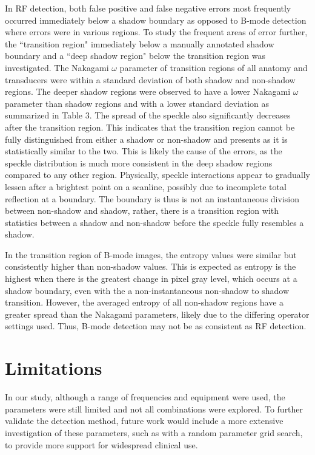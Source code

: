 \documentclass[authoryear,preprint,review,12pt]{elsarticle}
\begin{document}
In RF detection, both false positive and false negative errors most frequently occurred immediately below a shadow boundary as opposed to B-mode detection where errors were in various regions. To study the frequent areas of error further, the ``transition region" immediately below a manually annotated shadow boundary and a ``deep shadow region" below the transition region was investigated. The Nakagami $\omega$ parameter of transition regions  of all anatomy and transducers were within a standard deviation of both shadow and non-shadow regions. The deeper shadow regions were observed to have a lower Nakagami $\omega$ parameter than shadow regions and with a lower standard deviation as summarized in Table 3. The spread of the speckle also significantly decreases after the transition region. This indicates that the transition region cannot be fully distinguished from either a shadow or non-shadow and presents as it is statistically similar to the two. This is likely the cause of the errors, as the speckle distribution is much more consistent in the deep shadow regions compared to any other region. Physically, speckle interactions appear to gradually lessen after a brightest point on a scanline, possibly due to incomplete total reflection at a boundary. The boundary is thus is not an instantaneous division between non-shadow and shadow, rather, there is a transition region with statistics between a shadow and non-shadow before the speckle fully resembles a shadow.

In the transition region of B-mode images, the entropy values were similar but consistently higher than non-shadow values. This is expected as entropy is the highest when there is the greatest change in pixel gray level, which occurs at a shadow boundary, even with the a non-instantaneous non-shadow to shadow transition. However, the averaged entropy of all non-shadow regions have a greater spread than the Nakagami parameters, likely due to the differing operator settings used. Thus, B-mode detection may not be as consistent as RF detection.

\section*{Limitations}
In our study, although a range of frequencies and equipment were used, the parameters were still limited and not all combinations were explored. To further validate the detection method, future work would include a more extensive investigation of these parameters, such as with a random parameter grid search, to provide more support for widespread clinical use.
\end{document}
